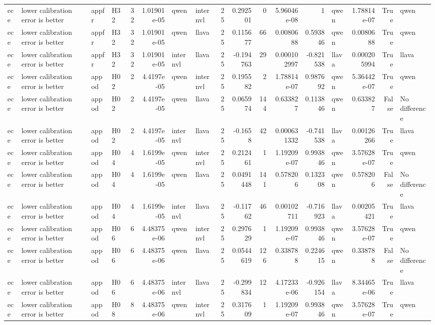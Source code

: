\begin{longtable}{llllrrllrrrrrlrrl}
ece & lower calibration error is better & appfr & H32 & 32 & 1.01901e-05 & qwen & internvl & 25 & 0.292501 & 0 & 5.96046e-08 & 1 & qwen & 1.78814e-07 & True & qwen \\
ece & lower calibration error is better & appfr & H32 & 32 & 1.01901e-05 & qwen & llava & 25 & 0.115677 & 66 & 0.0080688 & 0.593846 & qwen & 0.0080688 & True & qwen \\
ece & lower calibration error is better & appfr & H32 & 32 & 1.01901e-05 & internvl & llava & 25 & -0.194763 & 29 & 0.000102997 & -0.821538 & llava & 0.000205994 & True & llava \\
ece & lower calibration error is better & appod & H02 & 2 & 4.4197e-05 & qwen & internvl & 25 & 0.195582 & 2 & 1.78814e-07 & 0.987692 & qwen & 5.36442e-07 & True & qwen \\
ece & lower calibration error is better & appod & H02 & 2 & 4.4197e-05 & qwen & llava & 25 & 0.065974 & 144 & 0.633827 & 0.113846 & qwen & 0.633827 & False & No difference \\
ece & lower calibration error is better & appod & H02 & 2 & 4.4197e-05 & internvl & llava & 25 & -0.1658 & 42 & 0.000631332 & -0.741538 & llava & 0.00126266 & True & llava \\
ece & lower calibration error is better & appod & H04 & 4 & 1.6199e-05 & qwen & internvl & 25 & 0.212461 & 1 & 1.19209e-07 & 0.993846 & qwen & 3.57628e-07 & True & qwen \\
ece & lower calibration error is better & appod & H04 & 4 & 1.6199e-05 & qwen & llava & 25 & 0.0491448 & 141 & 0.578206 & 0.132308 & qwen & 0.578206 & False & No difference \\
ece & lower calibration error is better & appod & H04 & 4 & 1.6199e-05 & internvl & llava & 25 & -0.11762 & 46 & 0.00102711 & -0.716923 & llava & 0.00205421 & True & llava \\
ece & lower calibration error is better & appod & H06 & 6 & 4.48375e-06 & qwen & internvl & 25 & 0.297629 & 1 & 1.19209e-07 & 0.993846 & qwen & 3.57628e-07 & True & qwen \\
ece & lower calibration error is better & appod & H06 & 6 & 4.48375e-06 & qwen & llava & 25 & 0.0544619 & 126 & 0.338788 & 0.224615 & qwen & 0.338788 & False & No difference \\
ece & lower calibration error is better & appod & H06 & 6 & 4.48375e-06 & internvl & llava & 25 & -0.299834 & 12 & 4.17233e-06 & -0.926154 & llava & 8.34465e-06 & True & llava \\
ece & lower calibration error is better & appod & H08 & 8 & 4.48375e-06 & qwen & internvl & 25 & 0.317609 & 1 & 1.19209e-07 & 0.993846 & qwen & 3.57628e-07 & True & qwen \\

\end{longtable}
